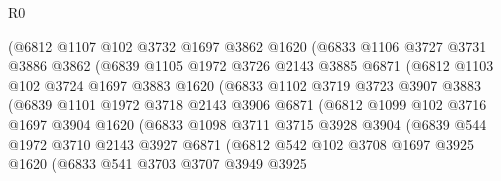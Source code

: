\begin{lexlean}{R0}
\begin{coremodule}
                  (@6812
                    @1107
                    @102
                    @3732
                    @1697
                    @3862
                    @1620
                    (@6833
                      @1106
                      @3727
                      @3731
                      @3886
                      @3862
                      (@6839
                        @1105
                        @1972
                        @3726
                        @2143
                        @3885
                        @6871
                        (@6812
                          @1103
                          @102
                          @3724
                          @1697
                          @3883
                          @1620
                          (@6833
                            @1102
                            @3719
                            @3723
                            @3907
                            @3883
                            (@6839
                              @1101
                              @1972
                              @3718
                              @2143
                              @3906
                              @6871
                              (@6812
                                @1099
                                @102
                                @3716
                                @1697
                                @3904
                                @1620
                                (@6833
                                  @1098
                                  @3711
                                  @3715
                                  @3928
                                  @3904
                                  (@6839
                                    @544
                                    @1972
                                    @3710
                                    @2143
                                    @3927
                                    @6871
                                    (@6812
                                      @542
                                      @102
                                      @3708
                                      @1697
                                      @3925
                                      @1620
                                      (@6833
                                        @541
                                        @3703
                                        @3707
                                        @3949
                                        @3925

\end{coremodule}
\end{lexlean}
